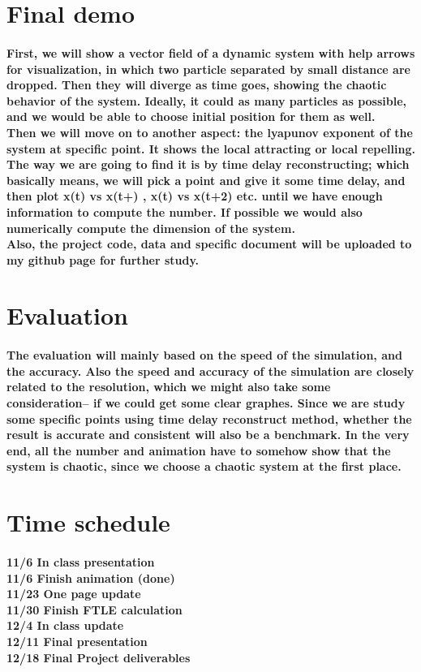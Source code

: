 \documentclass[12pt]{article}
\begin{document}
\section{Final demo}
\paragraph{
\indent First, we will show a vector field of a dynamic system with help arrows for visualization, in which two particle separated by small distance are dropped. Then they will diverge as time goes, showing the chaotic behavior of the system. Ideally, it could as many particles as possible, and we would be able to choose initial position for them as well. \\
\indent Then we will move on to another aspect: the lyapunov exponent of the system at specific point. It shows the local attracting or local repelling. The way we are going to find it is by time delay reconstructing; which basically means, we will pick a point and give it some time delay, and then plot x(t) vs x(t+) , x(t) vs x(t+2) etc. until we have enough information to compute the number. If possible we would also numerically compute the dimension of the system.  \\
\indent Also, the project code, data and  specific document will be uploaded to my github page for further study. \\
}


\section{Evaluation}
\paragraph{
\indent The evaluation will mainly based on the speed of the simulation, and the accuracy. Also the speed and accuracy of the simulation are closely related to the resolution, which we might also take some consideration-- if we could get some clear graphes. Since we are study some specific points using time delay reconstruct method, whether the result is accurate and consistent will also be a benchmark. In the very end, all the number and animation have to somehow show that the system is chaotic, since we choose a chaotic system at the first place.  \\
}


\section{Time schedule}
\paragraph{
	11/6		In class presentation \\
	11/6		Finish animation	(done) \\
	11/23		One page update  \\
	11/30		Finish FTLE calculation  \\
	12/4		In class update  \\
	12/11		Final presentation  \\
	12/18		Final Project deliverables  \\
}
\end{document}
